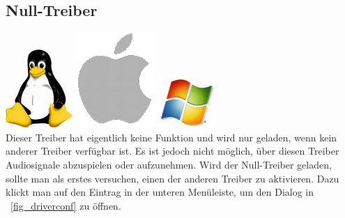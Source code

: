 \subsection{Null-Treiber}
\includegraphics[height=\baselineskip]{../images/tux.png}
\includegraphics[height=\baselineskip]{../images/mac.png}
\includegraphics[height=\baselineskip]{../images/win.png}
\\
Dieser Treiber hat eigentlich keine Funktion und wird nur geladen, wenn kein anderer Treiber verfügbar ist. Es ist jedoch nicht möglich, über diesen Treiber Audiosignale abzuspielen oder aufzunehmen. Wird der Null-Treiber geladen, sollte man als erstes versuchen, einen der anderen Treiber zu aktivieren. Dazu klickt man auf den Eintrag in der unteren Menüleiste, um den Dialog in \FigT\ \ref{fig_driverconf} zu öffnen.

